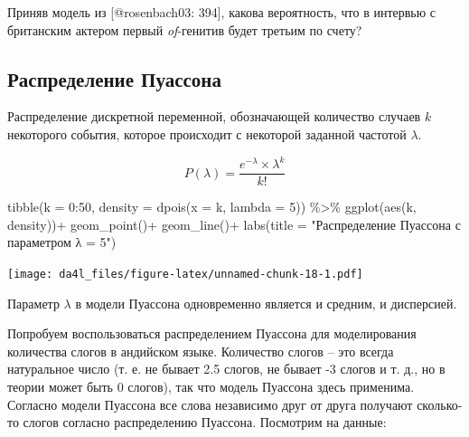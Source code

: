 \documentclass[
]{book}
\makeatletter
\newenvironment{Shaded}{\begin{snugshade}}{\end{snugshade}}
\newcommand{\AttributeTok}[1]{\textcolor[rgb]{0.77,0.63,0.00}{#1}}
\newcommand{\DecValTok}[1]{\textcolor[rgb]{0.00,0.00,0.81}{#1}}
\newcommand{\FunctionTok}[1]{\textcolor[rgb]{0.00,0.00,0.00}{#1}}
\newcommand{\NormalTok}[1]{#1}
\newcommand{\SpecialCharTok}[1]{\textcolor[rgb]{0.00,0.00,0.00}{#1}}
\newcommand{\StringTok}[1]{\textcolor[rgb]{0.31,0.60,0.02}{#1}}
\newenvironment{kframe}{%
    \medskip{}
    \setlength{\fboxsep}{.8em}
    \def\at@end@of@kframe{}%
    \ifinner\ifhmode%
    \def\at@end@of@kframe{\end{minipage}}%
    \begin{minipage}{\columnwidth}%
    \fi\fi%
    \def\FrameCommand##1{\hskip\@totalleftmargin \hskip-\fboxsep
    \colorbox{shadecolor}{##1}\hskip-\fboxsep
        \hskip-\linewidth \hskip-\@totalleftmargin \hskip\columnwidth}%
    \MakeFramed {\advance\hsize-\width
      \@totalleftmargin\z@ \linewidth\hsize
      \@setminipage}}%
  {\par\unskip\endMakeFramed%
    \at@end@of@kframe}
\newenvironment{rmdblock}[1]
  {
    \begin{itemize}
    \renewcommand{\labelitemi}{
      \raisebox{-.7\height}[0pt][0pt]{
        {\setkeys{Gin}{width=3em,keepaspectratio}\texttt{[image: images/\#1]}}
        }
        }
        \setlength{\fboxsep}{1em}
        \begin{kframe}
        \item
      }
      {
        \end{kframe}
        \end{itemize}
      }
\newenvironment{rmdtask}
      {\begin{rmdblock}{task}}
      {\end{rmdblock}}
\makeatother
\begin{document}
\begin{rmdtask}
Приняв модель из {[}@rosenbach03: 394{]}, какова вероятность, что в
интервью с британским актером первый \emph{of}-генитив будет третьим по
счету?
\end{rmdtask}

\hypertarget{ux440ux430ux441ux43fux440ux435ux434ux435ux43bux435ux43dux438ux435-ux43fux443ux430ux441ux441ux43eux43dux430}{%
\subsection{Распределение Пуассона}\label{ux440ux430ux441ux43fux440ux435ux434ux435ux43bux435ux43dux438ux435-ux43fux443ux430ux441ux441ux43eux43dux430}}

Распределение дискретной переменной, обозначающей количество случаев \(k\) некоторого события, которое происходит с некоторой заданной частотой \(\lambda\).

\[P(\lambda) = \frac{e^{-\lambda}\times\lambda^k}{k!}\]

\begin{Shaded}
\begin{Highlighting}[]
\FunctionTok{tibble}\NormalTok{(}\AttributeTok{k =} \DecValTok{0}\SpecialCharTok{:}\DecValTok{50}\NormalTok{,}
       \AttributeTok{density =} \FunctionTok{dpois}\NormalTok{(}\AttributeTok{x =}\NormalTok{ k, }\AttributeTok{lambda =} \DecValTok{5}\NormalTok{)) }\SpecialCharTok{\%\textgreater{}\%} 
  \FunctionTok{ggplot}\NormalTok{(}\FunctionTok{aes}\NormalTok{(k, density))}\SpecialCharTok{+}
  \FunctionTok{geom\_point}\NormalTok{()}\SpecialCharTok{+}
  \FunctionTok{geom\_line}\NormalTok{()}\SpecialCharTok{+}
  \FunctionTok{labs}\NormalTok{(}\AttributeTok{title =} \StringTok{"Распределение Пуассона с параметром λ = 5"}\NormalTok{)}
\end{Highlighting}
\end{Shaded}

\texttt{[image: da4l\_files/figure-latex/unnamed-chunk-18-1.pdf]}

Параметр \(\lambda\) в модели Пуассона одновременно является и средним, и дисперсией.

Попробуем воспользоваться распределением Пуассона для моделирования количества слогов в андийском языке. Количество слогов -- это всегда натуральное число (т. е. не бывает 2.5 слогов, не бывает -3 слогов и т. д., но в теории может быть 0 слогов), так что модель Пуассона здесь применима. Согласно модели Пуассона все слова независимо друг от друга получают сколько-то слогов согласно распределению Пуассона. Посмотрим на данные:
\end{document}

